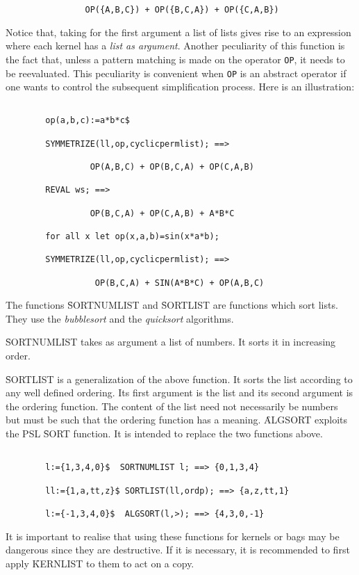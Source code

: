 \begin{itemize}
\begin{verbatim}
                OP({A,B,C}) + OP({B,C,A}) + OP({C,A,B})

\end{verbatim}
Notice that, taking for the first argument a list of lists gives rise to
an expression where  each kernel has a {\em list as argument}. Another
peculiarity of this function is the fact that, unless a pattern matching is
made on the operator \verb+OP+, it needs to be reevaluated. This peculiarity
is convenient when \verb+OP+ is an abstract operator if one wants to 
control the subsequent simplification process. Here is an illustration:
\begin{verbatim}

        op(a,b,c):=a*b*c$

        SYMMETRIZE(ll,op,cyclicpermlist); ==>

                 OP(A,B,C) + OP(B,C,A) + OP(C,A,B)

        REVAL ws; ==>
                 
                 OP(B,C,A) + OP(C,A,B) + A*B*C

        for all x let op(x,a,b)=sin(x*a*b);

        SYMMETRIZE(ll,op,cyclicpermlist); ==>

                  OP(B,C,A) + SIN(A*B*C) + OP(A,B,C)

\end{verbatim}
The functions \f{SORTNUMLIST} and \f{SORTLIST} are functions which sort
lists. They use the {\em bubblesort} and the {\em quicksort} algorithms.

\f{SORTNUMLIST} takes as argument a list of numbers. It sorts it in
increasing order.

\f{SORTLIST} is a generalization of the above function.
It sorts the list according
to any well defined ordering. Its first argument is the list and its
second argument is the ordering function. The content of the list
need not necessarily be numbers but must be such that the ordering function
has a meaning.
\f{ALGSORT} exploits the PSL \f{SORT} function. It is intended to replace
the two functions above.
\begin{verbatim}

        l:={1,3,4,0}$  SORTNUMLIST l; ==> {0,1,3,4}

        ll:={1,a,tt,z}$ SORTLIST(ll,ordp); ==> {a,z,tt,1}

        l:={-1,3,4,0}$  ALGSORT(l,>); ==> {4,3,0,-1}

\end{verbatim}
It is important to realise that using these functions for kernels or bags
may be dangerous since they are destructive. If it is necessary, it is
recommended to first apply \f{KERNLIST} to them to act on a copy.


\end{itemize}
